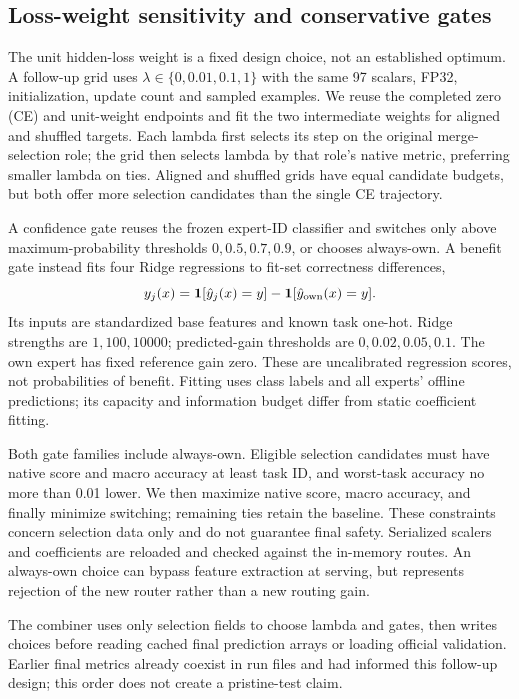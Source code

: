 \documentclass[11pt,a4paper]{article}
\begin{document}
\subsection{Loss-weight sensitivity and conservative gates}
The unit hidden-loss weight is a fixed design choice, not an established optimum. A follow-up grid uses $\lambda\in\{0,0.01,0.1,1\}$ with the same 97 scalars, FP32, initialization, update count and sampled examples. We reuse the completed zero (CE) and unit-weight endpoints and fit the two intermediate weights for aligned and shuffled targets. Each lambda first selects its step on the original merge-selection role; the grid then selects lambda by that role's native metric, preferring smaller lambda on ties. Aligned and shuffled grids have equal candidate budgets, but both offer more selection candidates than the single CE trajectory.

A confidence gate reuses the frozen expert-ID classifier and switches only above maximum-probability thresholds $0,0.5,0.7,0.9$, or chooses always-own. A benefit gate instead fits four Ridge regressions to fit-set correctness differences,
\begin{equation}
 y_j(x)=\mathbf{1}[\hat y_j(x)=y]-\mathbf{1}[\hat y_{\rm own}(x)=y].
\end{equation}
Its inputs are standardized base features and known task one-hot. Ridge strengths are $1,100,10000$; predicted-gain thresholds are $0,0.02,0.05,0.1$. The own expert has fixed reference gain zero. These are uncalibrated regression scores, not probabilities of benefit. Fitting uses class labels and all experts' offline predictions; its capacity and information budget differ from static coefficient fitting.

Both gate families include always-own. Eligible selection candidates must have native score and macro accuracy at least task ID, and worst-task accuracy no more than 0.01 lower. We then maximize native score, macro accuracy, and finally minimize switching; remaining ties retain the baseline. These constraints concern selection data only and do not guarantee final safety. Serialized scalers and coefficients are reloaded and checked against the in-memory routes. An always-own choice can bypass feature extraction at serving, but represents rejection of the new router rather than a new routing gain.

The combiner uses only selection fields to choose lambda and gates, then writes choices before reading cached final prediction arrays or loading official validation. Earlier final metrics already coexist in run files and had informed this follow-up design; this order does not create a pristine-test claim.
\end{document}

